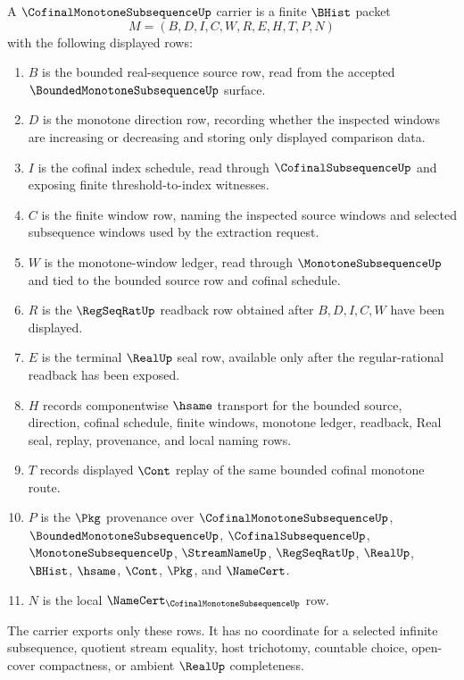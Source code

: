 \begin{definition}
\label{def:cofinal-monotone-subsequence-carrier}
A $\CofinalMonotoneSubsequenceUp$ carrier is a finite $\BHist$ packet
$$
M=(B,D,I,C,W,R,E,H,T,P,N)
$$
with the following displayed rows:
\begin{enumerate}
\item $B$ is the bounded real-sequence source row, read from the accepted $\BoundedMonotoneSubsequenceUp$ surface.
\item $D$ is the monotone direction row, recording whether the inspected windows are increasing or decreasing and storing only displayed comparison data.
\item $I$ is the cofinal index schedule, read through $\CofinalSubsequenceUp$ and exposing finite threshold-to-index witnesses.
\item $C$ is the finite window row, naming the inspected source windows and selected subsequence windows used by the extraction request.
\item $W$ is the monotone-window ledger, read through $\MonotoneSubsequenceUp$ and tied to the bounded source row and cofinal schedule.
\item $R$ is the $\RegSeqRatUp$ readback row obtained after $B,D,I,C,W$ have been displayed.
\item $E$ is the terminal $\RealUp$ seal row, available only after the regular-rational readback has been exposed.
\item $H$ records componentwise $\hsame$ transport for the bounded source, direction, cofinal schedule, finite windows, monotone ledger, readback, Real seal, replay, provenance, and local naming rows.
\item $T$ records displayed $\Cont$ replay of the same bounded cofinal monotone route.
\item $P$ is the $\Pkg$ provenance over $\CofinalMonotoneSubsequenceUp$, $\BoundedMonotoneSubsequenceUp$, $\CofinalSubsequenceUp$, $\MonotoneSubsequenceUp$, $\StreamNameUp$, $\RegSeqRatUp$, $\RealUp$, $\BHist$, $\hsame$, $\Cont$, $\Pkg$, and $\NameCert$.
\item $N$ is the local $\NameCert_{\CofinalMonotoneSubsequenceUp}$ row.
\end{enumerate}
The carrier exports only these rows. It has no coordinate for a selected infinite subsequence, quotient stream equality, host trichotomy, countable choice, open-cover compactness, or ambient $\RealUp$ completeness.
\end{definition}

